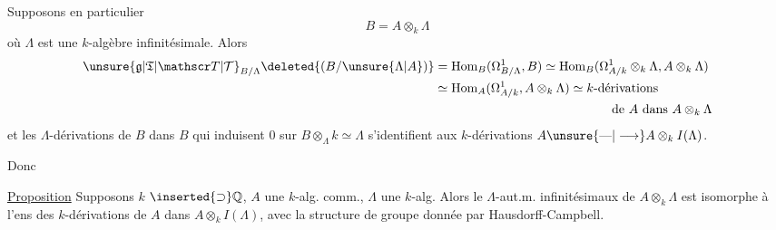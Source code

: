 Supposons en particulier
\[
B=A\otimes_k\Lambda
\]
où $\Lambda$ est une $k$-algèbre infinitésimale.
Alors 
\[
\begin{aligned}
\unsure{\mathfrak g|\mathfrak T|\mathscr T|\mathcal T}_{B/\Lambda}\deleted{(B/\unsure{\Lambda|A})}
&=\mathrm{Hom}_B(\Omega^1_{B/\Lambda},B)\simeq\mathrm{Hom}_B(\Omega^1_{A/k}\otimes_k\Lambda,A\otimes_k\Lambda)\\
&\simeq\mathrm{Hom}_A(\Omega^1_{A/k},A\otimes_k\Lambda)\simeq k\text{-dérivations}\\
&\hspace{14em}\text{de }A\text{ dans }A\otimes_k\Lambda
\end{aligned}
\]
et les $\Lambda$-dérivations de $B$ dans $B$ qui
induisent $0$ sur $B\otimes_\Lambda k\simeq\Lambda$ s'identifient
aux $k$-dérivations $A\unsure{\text{—}|\longrightarrow} A\otimes_k I(\Lambda)$.

Donc

\uline{Proposition} Supposons $k$  $\inserted{\supset}\mathbb Q$, $A$ une
\reversemarginpar{}\normalmarginpar
$k$-alg. comm., $\Lambda$ une $k$-alg. 
Alors le  $\Lambda$-aut.m. infinitésimaux de
$A\otimes_k\Lambda$  est isomorphe
à l'ens des $k$-dérivations de
$A$ dans $A\otimes_k I(\Lambda)$, avec la structure
de groupe donnée par Hausdorff-Campbell.

